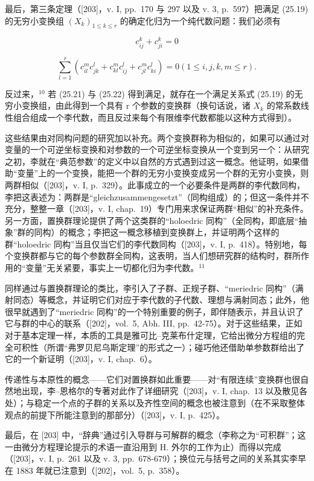 最后，第三条定理（{[}203{]}，v. I, pp.~170 与 297 以及 v. 3, p.~597）把满足 (25.19) 的无穷小变换组 \((X_{k})_{1\leq k\leq r}\) 的确定化归为一个纯代数问题：我们必须有

\[
c _ {i j} ^ {k} + c _ {j i} ^ {k} = 0\tag{25.21}
\]

\[
\sum_ {l = 1} ^ {r} (c _ {i l} ^ {m} c _ {j k} ^ {l} + c _ {k l} ^ {m} c _ {i j} ^ {l} + c _ {j l} ^ {m} c _ {k i} ^ {l}) = 0 (1 \leq i, j, k, m \leq r).\tag{25.22}
\]

反过来，\(^{10}\) 若 (25.21) 与 (25.22) 得到满足，就存在一个满足关系式 (25.19) 的无穷小变换组，由此得到一个具有 r 个参数的变换群（换句话说，诸 \(X_{k}\) 的常系数线性组合组成一个李代数，而且反过来每个有限维李代数都能以这种方式得到）。

这些结果由对同构问题的研究加以补充。两个变换群称为相似的，如果可以通过对变量的一个可逆坐标变换和对参数的一个可逆坐标变换从一个变到另一个：从研究之初，李就在“典范参数”的定义中以自然的方式遇到过这一概念。他证明，如果借助“变量”上的一个变换，能把一个群的无穷小变换变成另一个群的无穷小变换，则两群相似（{[}203{]}，v. I, p.~329）。此事成立的一个必要条件是两群的李代数同构，李把这表述为：两群是“gleichzusammengesetzt”（同构组成）的；但这一条件并不充分，整整一章（{[}203{]}，v. I, chap.~19）专门用来求保证两群“相似”的补充条件。另一方面，置换群理论提供了两个这类群的“holoedric 同构”（全同构，即底层“抽象”群的同构）的概念；李把这一概念移植到变换群上，并证明两个这样的群“holoedric 同构”当且仅当它们的李代数同构（{[}203{]}，v. I, p.~418）。特别地，每个变换群都与它的每个参数群全同构，这表明，当人们想研究群的结构时，群所作用的“变量”无关紧要，事实上一切都化归为李代数。\(^{11}\)

同样通过与置换群理论的类比，李引入了子群、正规子群、“meriedric 同构”（满射同态）等概念，并证明它们对应于李代数的子代数、理想与满射同态；此外，他很早就遇到了“meriedric 同构”的一个特别重要的例子，即伴随表示，并且认识了它与群的中心的联系（{[}202{]}，vol.~5, Abh. III, pp.~42-75）。对于这些结果，正如对于基本定理一样，本质的工具是雅可比–克莱布什定理，它给出微分方程组的完全可积性（所谓“弗罗贝尼乌斯定理”的形式之一）；碰巧他还借助单参数群给出了它的一个新证明（{[}203{]}，v. I, chap.~6）。

传递性与本原性的概念——它们对置换群如此重要——对“有限连续”变换群也很自然地出现，李–恩格尔的专著对此作了详细研究（{[}203{]}，v. I, chap.~13 以及散见各处）；与稳定一个点的子群的关系以及齐性空间的概念也被注意到（在不采取整体观点的前提下所能注意到的那部分）（{[}203{]}，v. I, p.~425）。

最后，在 {[}203{]} 中，“辞典”通过引入导群与可解群的概念（李称之为“可积群”；这一由微分方程理论提示的术语一直沿用到 H. 外尔的工作为止）而得以完成（{[}203{]}，v. I, p.~261 以及 v. 3, pp.~678-679）；换位元与括号之间的关系其实李早在 1883 年就已注意到（{[}202{]}，vol.~5, p.~358）。


